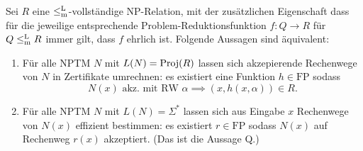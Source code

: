 \begin{lemma}\label{lemma:q-generalized}
Sei $R$ eine $\leq_\mathrm{m}^\mathrm{L}$-vollständige NP-Relation, mit der zusätzlichen Eigenschaft dass für die jeweilige entsprechende Problem-Reduktionsfunktion $f\colon Q\to R$ für $Q\leq_\mathrm{m}^\mathrm{L} R$ immer gilt, dass $f$ ehrlich ist. %
Folgende Aussagen sind äquivalent:
\begin{enumerate}
    \item Für alle NPTM $N$ mit $L(N)=\operatorname{Proj}(R)$ lassen sich akzepierende Rechenwege von $N$ in Zertifikate umrechnen: es existiert eine Funktion $h\in\mathrm{FP}$ sodass
        \[ N(x) \text{ akz. mit RW $\alpha$} \implies (x,h(x,\alpha))\in R. \]
    \item Für alle NPTM $N$ mit $L(N)=\Sigma^*$ lassen sich aus Eingabe $x$ Rechenwege von $N(x)$ effizient bestimmen: es existiert $r\in\mathrm{FP}$ sodass $N(x)$ auf Rechenweg $r(x)$ akzeptiert. (Das ist die Aussage Q.)
\end{enumerate}
\end{lemma}


